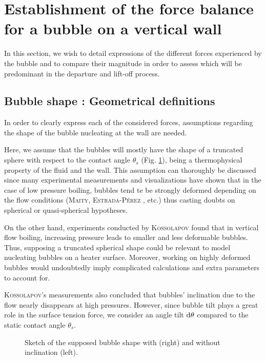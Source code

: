 \section{Establishment of the force balance for a bubble on a vertical wall }


In this section, we wish to detail expressions of the different forces experienced by the bubble and to compare their magnitude in order to assess which will be predominant in the departure and lift-off process.

\subsection{Bubble shape : Geometrical definitions}

\label{subsec:geom_bub}

In order to clearly express each of the considered forces, assumptions regarding the shape of the bubble nucleating at the wall are needed.

\npar

Here, we assume that the bubbles will mostly have the shape of a truncated sphere with respect to the contact angle $\theta_{s}$ (Fig. \ref{fig:bub_shape}), being a thermophysical property of the fluid and the  wall. This assumption can thoroughly be discussed since many experimental measurements and visualizations have shown that in the case of low pressure boiling, bubbles tend te be strongly deformed depending on the flow conditions (\textsc{Maity}, \textsc{Estrada-Pérez} \etal, etc.) thus casting doubts on spherical or quasi-spherical hypotheses.

\npar
On the other hand, experiments conducted by \textsc{Kossolapov} found that in vertical flow boiling, increasing pressure leads to smaller and less deformable bubbles. Thus, supposing a truncated spherical shape could be relevant to model nucleating bubbles on a heater surface. Moreover, working on highly deformed bubbles would undoubtedly imply complicated calculations and extra parameters to account for.

\textsc{Kossolapov}'s measurements also concluded that bubbles' inclination due to the flow nearly disappears at high pressures. However, since bubble tilt plays a great role in the surface tension force, we consider an angle tilt $\mathrm{d}\theta$ compared to the static contact angle $\theta_{s}$.

\begin{figure}[h!]
\centering

\caption{Sketch of the supposed bubble shape with (right) and without inclination (left).}
\label{fig:bub_shape}

\end{figure}




